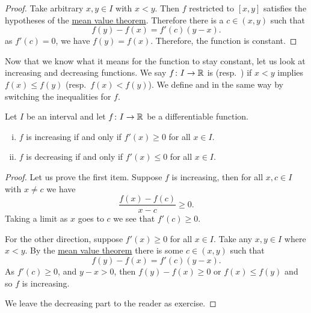 \begin{proof}
Take arbitrary $x,y \in I$ with $x < y$.
Then $f$ restricted to $[x,y]$ satisfies the hypotheses
of the \hyperref[thm:mvt]{mean value theorem}.
Therefore there is a $c \in (x,y)$ such that
\begin{equation*}
f(y)-f(x) = f'(c)(y-x).
\end{equation*}
as $f'(c) = 0$, we have $f(y) = f(x)$.  Therefore,
the function is constant.
\end{proof}

Now that we know what it means for the function to stay constant, let us look
at increasing and decreasing functions.
We say $f \colon I \to {\mathbb{R}}$ is \emph{}
(resp.\  \emph{}) if
$x < y$ implies $f(x) \leq f(y)$ (resp.\ $f(x) < f(y)$).
We define
\emph{} and
\emph{} in the same way by switching the
inequalities for $f$.

\begin{prop} \label{incdecdiffprop}
Let $I$ be an interval and
let $f \colon I \to {\mathbb{R}}$ be a differentiable function.
\begin{enumerate}[(i)]
\item $f$ is increasing if and only if $f'(x) \geq 0$ for all $x \in I$.
\item $f$ is decreasing if and only if $f'(x) \leq 0$ for all $x \in I$.
\end{enumerate}
\end{prop}

\begin{proof}
Let us prove the first item.  Suppose $f$ is increasing, then
for all $x,c \in I$ with $x \neq c$ we have
\begin{equation*}
\frac{f(x)-f(c)}{x-c} \geq 0 .
\end{equation*}
Taking a limit as $x$ goes to $c$ we see that $f'(c) \geq 0$.

For the other direction, suppose $f'(x) \geq 0$ for all $x \in I$.
Take any $x, y \in I$ where $x < y$.  By the \hyperref[thm:mvt]{mean value theorem}
there is some $c \in
(x,y)$ such that
\begin{equation*}
f(y)-f(x) = f'(c)(y-x) .
\end{equation*}
As $f'(c) \geq 0$, and $y-x > 0$, then $f(y) - f(x) \geq 0$ or $f(x) \leq
f(y)$ and so
$f$ is increasing.

We leave the decreasing part to the reader as exercise.
\end{proof}

